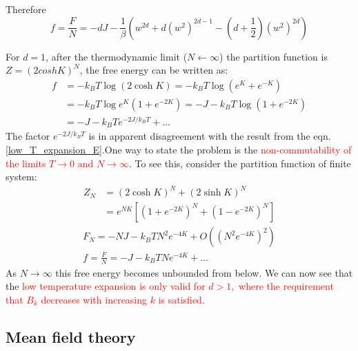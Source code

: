 \documentclass[12pt,titlepage]{article}
\numberwithin{equation}{section}
\begin{document}
Therefore
\begin{equation}
\label{low_T_expansion_E}
f=\frac{F}{N}=-d J-\frac{1}{\beta}\left(w^{2 d}+d\left(w^{2}\right)^{2 d-1}-\left(d+\frac{1}{2}\right)\left(w^{2}\right)^{2 d}\right)
\end{equation}

For $d=1$, after the thermodynamic limit ($N\leftarrow\infty$) the partition function is $Z=(2coshK)^N$, the free energy can be written as:
\begin{equation}
\begin{aligned} f &=-k_{B} T \log (2 \cosh K)=-k_{B} T \log \left(e^{K}+e^{-K}\right) \\ &=-k_{B} T \log e^{K}\left(1+e^{-2 K}\right)=-J-k_{B} T \log \left(1+e^{-2 K}\right) \\ &=-J-k_{B} T e^{-2 J / k_{B} T}+\ldots \end{aligned}
\end{equation}
The factor $e^{-2 J / k_{B} T}$ is in apparent disagreement with the result from the eqn.\ref{low_T_expansion_E}.One way to state the problem is the \textcolor{red}{non-commutability of the limits $T \rightarrow 0$ and $N \rightarrow \infty$}. To see this, consider the partition function of finite system:
\begin{equation}
    \begin{aligned} Z_{N} &=(2 \cosh K)^{N}+(2 \sinh K)^{N} \\ &=e^{N K}\left[\left(1+e^{-2 K}\right)^{N}+\left(1-e^{-2 K}\right)^{N}\right] \end{aligned}
\end{equation}
\begin{equation}
\begin{array}{c}{F_{N}=-N J-k_{B} T N^{2} e^{-4 K}+O\left(\left(N^{2} e^{-4 K}\right)^{2}\right)} \\ {f=\frac{F}{N}=-J-k_{B} T N e^{-4 K}+\ldots}\end{array}
\end{equation}
As $N \rightarrow \infty$ this free energy becomes unbounded from below. We can now see that the \textcolor{red}{low temperature expansion is only valid for $d>1,$ where the requirement that $B_{k}$ decreases with increasing $k$ is satisfied}.

\subsection{Mean field theory}
\end{document}
